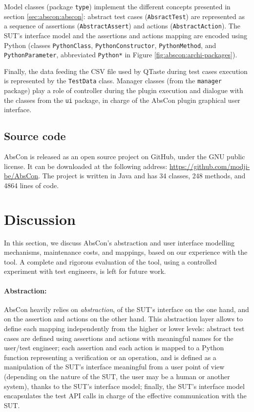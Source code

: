 Model classes (package \texttt{type}) implement the different concepts presented in section \ref{sec:abscon:abscon}: abstract test cases (\texttt{AbsractTest}) are represented as a sequence of assertions (\texttt{AbstractAssert}) and actions (\texttt{AbstractAction}). The SUT's interface model and the assertions and actions mapping are encoded using Python (classes \texttt{PythonClass}, \texttt{PythonConstructor}, \texttt{PythonMethod}, and \texttt{PythonParameter}, abbreviated \texttt{Python*} in Figure \ref{fig:abscon:archi-packages}). 

Finally, the data feeding the CSV file used by QTaste during test cases execution is represented by the  \texttt{TestData} class. Manager classes (from the \texttt{manager} package) play a role of controller during the plugin execution and dialogue with the classes from the \texttt{ui} package, in charge of the AbsCon plugin graphical user interface.


\subsection{Source code}

AbsCon is released as an open source project on GitHub, under the GNU public license. It can be downloaded at the following address: \url{https://github.com/modji-be/AbsCon}. The project is written in Java and has 34 classes, 248 methods, and 4864 lines of code.

\section{Discussion}

\label{sec:abscon:discussion}

In this section, we discuss AbsCon's abstraction and user interface modelling mechanisms, maintenance costs, and mappings, based on our experience with the tool. A complete and rigorous evaluation of the tool, using a controlled experiment \cite{Wohlin2000} with test engineers, is left for future work.

\paragraph{Abstraction:}

AbsCon heavily relies on \emph{abstraction}, of the SUT's interface on the one hand, and on the assertion and actions on the other hand. This abstraction layer allows to define each mapping independently from the higher or lower levels: abstract test cases are defined using assertions and actions with meaningful names for the user/test engineer; each assertion and each action is mapped to a Python function representing a verification or an operation, and is defined as a manipulation of the SUT's interface meaningful from a user point of view (depending on the nature of the SUT, the user may be a human or another system), thanks to the SUT's interface model; finally, the SUT's interface model encapsulates the test API calls in charge of the effective communication with the SUT. 

